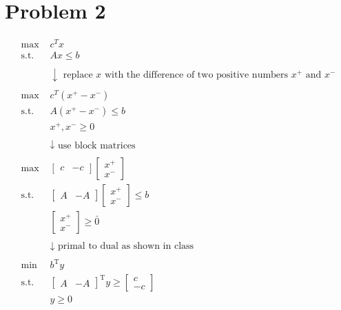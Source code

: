 \documentclass[12pt]{article}
\begin{document}
\section*{Problem 2}
\begin{align*}
    \text{max } & c^T x \\
    \text{s.t. } & Ax \leq b \\
    \\
    & \downarrow \text{ replace $x$ with the difference of two positive numbers $x^+$ and $x^-$}\\
    \\
    \text{max } & c^T(x^+ - x^-) \\
    \text{s.t. } & A(x^+ - x^-) \leq b \\
    & x^+, x^- \geq 0 \\
    \\
    & \downarrow \text{ use block matrices}\\
    \\
    \text{max } & \begin{bmatrix} c & -c \end{bmatrix} \begin{bmatrix} x^+ \\ x^- \end{bmatrix} \\
    \text{s.t. } & \begin{bmatrix} A & -A \end{bmatrix} \begin{bmatrix} x^+ \\ x^- \end{bmatrix} \leq b \\
    & \begin{bmatrix} x^+ \\ x^- \end{bmatrix} \geq \bar{0} \\
    \\
    & \downarrow \text{ primal to dual as shown in class}\\
    \\
    \text{min } & b^\text{T}y \\
    \text{s.t. } & \begin{bmatrix} A & -A \end{bmatrix}^\text{T} y \geq \begin{bmatrix} c \\ -c \end{bmatrix} \\
    & y \geq 0 \\
    \\

\end{align*}
\end{document}
